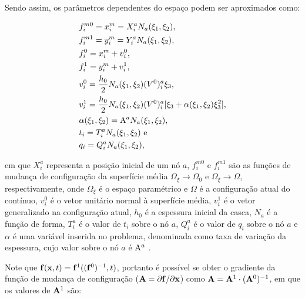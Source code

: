 Sendo assim, os parâmetros dependentes do espaço podem ser aproximados como:

\begin{subequations}
    \begin{align}
         & f_i^{m0}=x_i^m=X_i^aN_a(\xi_1,\xi_2)\text{,}                                            \\
         & f_i^{m1}=y_i^m=Y_i^aN_a(\xi_1,\xi_2)\text{,}                                            \\
         & f_i^0=x_i^m+v_i^0\text{,}                                                               \\
         & f_i^1=y_i^m+v_i^1\text{,}                                                               \\
         & v_i^0=\frac{h_0}{2}N_ a(\xi_1,\xi_2)(V^0)_i^a\xi_3\text{,}                              \\
         & v_i^1=\frac{h_0}{2}N_ a(\xi_1,\xi_2)(V^0)_i^a[\xi_3+\alpha(\xi_1,\xi_2)\xi_3^2]\text{,} \\
         & \alpha(\xi_1,\xi_2)=\mathrm{A}^aN_a(\xi_1,\xi_2)\text{,}                                    \\
         & t_i=T_i^aN_a(\xi_1,\xi_2)\text{ e}                                                      \\
         & q_i=Q_i^aN_a(\xi_1,\xi_2)\text{,}
    \end{align}
\end{subequations}

\noindent em que $X_i^a$ representa a posição inicial de um nó $a$, $f_i^{m0}$ e $f_i^{m1}$ são as funções de mudança de configuração da superfície média $\Omega_\xi\to\Omega_0$ e $\Omega_\xi\to\Omega$, respectivamente, onde $\Omega_\xi$ é o espaço paramétrico e $\Omega$ é a configuração atual do contínuo, $v_i^0$ é o vetor unitário normal à superfície média, $v_i^1$ é o vetor generalizado na configuração atual, $h_0$ é a espessura inicial da casca, $N_a$ é a função de forma, $T_i^a$ é o valor de $t_i$ sobre o nó $a$, $Q_i^a$ é o valor de $q_i$ sobre o nó $a$ e $\alpha$ é uma variável inserida no problema, denominada como taxa de variação da espessura, cujo valor sobre o nó $a$ é $\mathrm{A}^a$ \cite{sanches2013unconstrained,sanches2014fluid}.

Note que $\mathbf{f}(\mathbf{x},t)=\mathbf{f}^1((\mathbf{f}^0)^{-1},t)$, portanto é possível se obter o gradiente da função de mudança de configuração ($\mathbf{A}=\partial\mathbf{f}/\partial\mathbf{x}$) como $\mathbf{A}=\mathbf{A}^1\cdot(\mathbf{A}^0)^{-1}$, em que os valores de $\mathbf{A}^1$ são:

